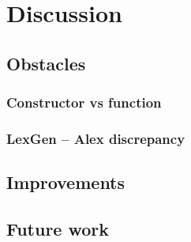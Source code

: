 \chapter{Discussion}

\section{Obstacles}
\subsection{Constructor vs function}
\subsection{LexGen -- Alex discrepancy}

\section{Improvements}
\section{Future work}
